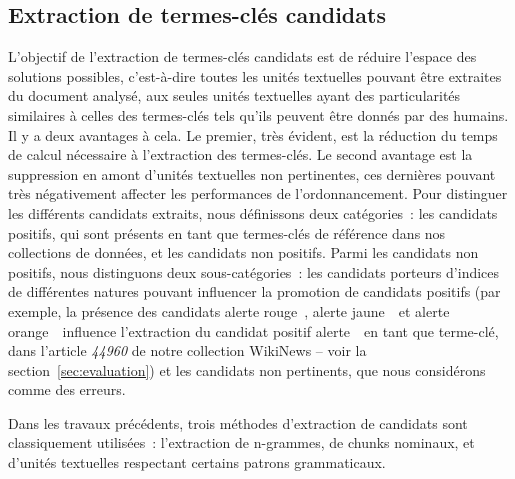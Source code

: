   \subsection{Extraction de termes-clés candidats}
  \label{subsec:extraction_de_termes_cles_candidats}
    L'objectif de l'extraction de termes-clés candidats est de réduire l'espace
    des solutions possibles, c'est-à-dire toutes les unités textuelles pouvant
    être extraites du document analysé, aux seules unités textuelles ayant des
    particularités similaires à celles des termes-clés tels qu'ils peuvent être
    donnés par des humains. Il y a deux avantages à cela. Le premier, très
    évident, est la réduction du temps de calcul nécessaire à l'extraction des
    termes-clés. Le second avantage est la suppression en amont d'unités
    textuelles non pertinentes, ces dernières pouvant très négativement affecter
    les performances de l'ordonnancement. Pour distinguer les différents
    candidats extraits, nous définissons deux catégories~: les candidats
    positifs, qui sont présents en tant que termes-clés de référence dans nos
    collections de données, et les candidats non positifs. Parmi les candidats
    non positifs, nous distinguons deux sous-catégories~: les candidats porteurs
    d'indices de différentes natures pouvant influencer la promotion de
    candidats positifs (par exemple, la présence des candidats \og alerte
    rouge~\fg, \og alerte jaune~\fg\ et \og alerte orange~\fg\ influence
    l'extraction du candidat positif \og alerte~\fg\ en tant que terme-clé,
    dans l'article \textit{44960} de notre collection WikiNews -- voir la
    section~\ref{sec:evaluation}) et les candidats non pertinents, que nous
    considérons comme des erreurs.

    Dans les travaux précédents, trois méthodes d'extraction de candidats sont
    classiquement utilisées~: l'extraction de n-grammes, de chunks nominaux, et
    d'unités textuelles respectant certains patrons grammaticaux.

